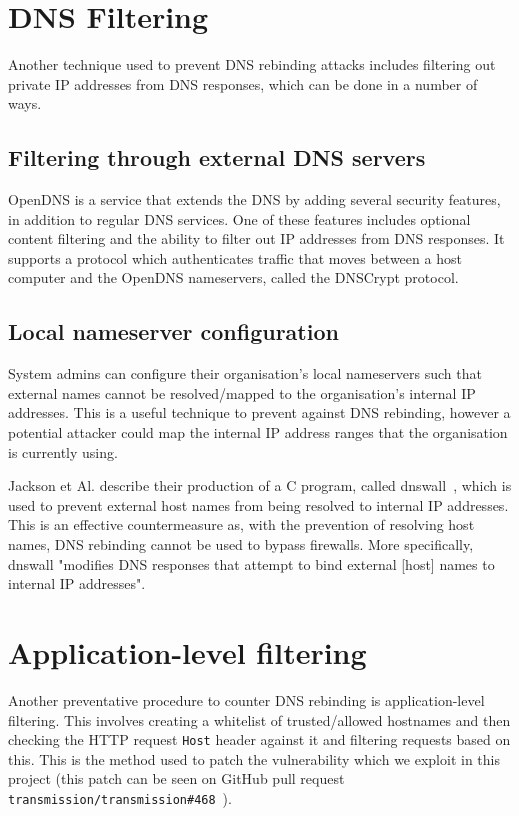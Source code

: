 \section{DNS Filtering}

Another technique used to prevent DNS rebinding attacks includes
filtering out private IP addresses from DNS responses, which can be
done in a number of ways.

\subsection{Filtering through external DNS servers}

OpenDNS is a service that extends the DNS by adding several security
features, in addition to regular DNS services. One of these features
includes optional content filtering and the ability to filter out
IP addresses from DNS responses. It supports a protocol which
authenticates traffic that moves between a host computer and the
OpenDNS nameservers, called the DNSCrypt protocol.

\subsection{Local nameserver configuration}

System admins can configure their organisation's local nameservers
such that external names cannot be resolved/mapped to the organisation's
internal IP addresses. This is a useful technique to prevent against
DNS rebinding, however a potential attacker could map the internal
IP address ranges that the organisation is currently using.

Jackson et Al. describe their production of a C program, called
dnswall~\cite{jackson2009protecting}, which is used to prevent external
host names from being resolved to internal IP addresses. This is an effective
countermeasure as, with the prevention of resolving host names,
DNS rebinding cannot be used to bypass firewalls. More specifically,
dnswall "modifies DNS responses that attempt to bind external [host] names
to internal IP addresses".

\section{Application-level filtering}

Another preventative procedure to counter DNS rebinding is application-level
filtering. This involves creating a whitelist of trusted/allowed hostnames and
then checking the HTTP request \texttt{Host} header against it and filtering
requests based on this. This is the method used to patch the vulnerability
which we exploit in this project (this patch can be seen on GitHub pull
request \texttt{transmission/transmission\#468}~\cite{transmission_pr}).
